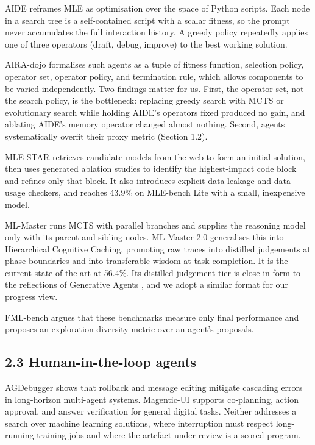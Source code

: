 \documentclass[11pt]{article}
\begin{document}
AIDE \cite{aide} reframes MLE as optimisation over the space of Python scripts. Each
node in a search tree is a self-contained script with a scalar fitness, so the prompt
never accumulates the full interaction history. A greedy policy repeatedly applies one
of three operators (draft, debug, improve) to the best working solution.

AIRA-dojo \cite{aira} formalises such agents as a tuple of fitness function,
selection policy, operator set, operator policy, and termination rule, which allows
components to be varied independently. Two findings matter for us. First, the
operator set, not the search policy, is the bottleneck: replacing greedy search with
MCTS or evolutionary search while holding AIDE's operators fixed produced no gain, and
ablating AIDE's memory operator changed almost nothing. Second, agents systematically
overfit their proxy metric (Section 1.2).

MLE-STAR \cite{mlestar} retrieves candidate models from the web to form an initial
solution, then uses generated ablation studies to identify the highest-impact code
block and refines only that block. It also introduces explicit data-leakage and
data-usage checkers, and reaches 43.9\% on MLE-bench Lite with a small, inexpensive
model.

ML-Master \cite{mlmaster} runs MCTS with parallel branches and supplies the reasoning
model only with its parent and sibling nodes. ML-Master 2.0 \cite{mlmaster2}
generalises this into Hierarchical Cognitive Caching, promoting raw traces into
distilled judgements at phase boundaries and into transferable wisdom at task
completion. It is the current state of the art at 56.4\%. Its distilled-judgement
tier is close in form to the reflections of Generative Agents \cite{genagents}, and
we adopt a similar format for our progress view.

FML-bench \cite{fmlbench} argues that these benchmarks measure only final performance
and proposes an exploration-diversity metric over an agent's proposals.

\subsection*{2.3 Human-in-the-loop agents}

AGDebugger \cite{agdebugger} shows that rollback and message editing mitigate
cascading errors in long-horizon multi-agent systems. Magentic-UI \cite{magentic}
supports co-planning, action approval, and answer verification for general digital
tasks. Neither addresses a search over machine learning solutions, where interruption
must respect long-running training jobs and where the artefact under review is a
scored program.
\end{document}
